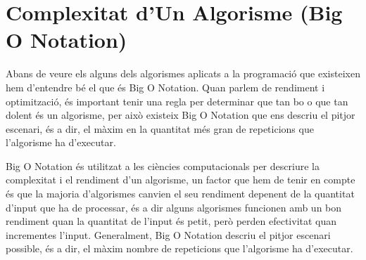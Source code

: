 \section{Complexitat d'Un Algorisme (Big O Notation)}

Abans de veure els alguns dels algorismes aplicats a la programació que existeixen hem d'entendre bé el que és Big O Notation.
Quan parlem de rendiment i optimització, és important tenir una regla per determinar que tan bo o que tan dolent és un algorisme, per això existeix Big O Notation que ens descriu el pitjor escenari, és a dir, el màxim en la quantitat més gran de repeticions que l'algorisme ha d'executar. \newline

Big O Notation és utilitzat a les ciències computacionals per descriure la complexitat i el rendiment d'un algorisme, un factor que hem de tenir en compte és que la majoria d'algorismes canvien el seu rendiment depenent de la quantitat d'input que ha de processar, és a dir alguns algorismes funcionen amb un bon rendiment quan la quantitat de l'input és petit, però perden efectivitat quan incrementes l'input.
Generalment, Big O Notation descriu el pitjor escenari possible, és a dir, el màxim nombre de repeticions que l'algorisme ha d'executar. \newline \newline

